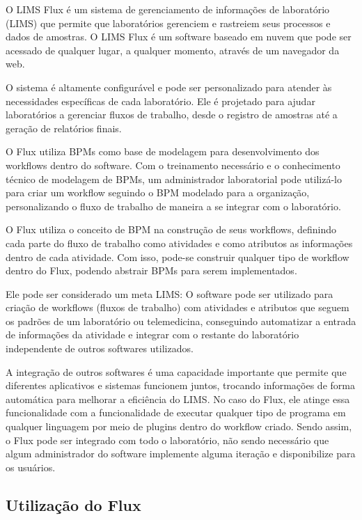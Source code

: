 
O LIMS Flux é um sistema de gerenciamento de informações de laboratório (LIMS) que permite que laboratórios gerenciem e rastreiem seus processos e dados de amostras. O LIMS Flux é um software baseado em nuvem que pode ser acessado de qualquer lugar, a qualquer momento, através de um navegador da web.

O sistema é altamente configurável e pode ser personalizado para atender às necessidades específicas de cada laboratório. Ele é projetado para ajudar laboratórios a gerenciar fluxos de trabalho, desde o registro de amostras até a geração de relatórios finais.

O Flux utiliza BPMs como base de modelagem para desenvolvimento dos workflows dentro do software. Com o treinamento necessário e o conhecimento técnico de modelagem de BPMs, um administrador laboratorial pode utilizá-lo para criar um workflow seguindo o BPM modelado para a organização, personalizando o fluxo de trabalho de maneira a se integrar com o laboratório.

O Flux utiliza o conceito de BPM na construção de seus workflows, definindo cada parte do fluxo de trabalho como atividades e como atributos as informações dentro de cada atividade. Com isso, pode-se construir qualquer tipo de workflow dentro do Flux, podendo abstrair BPMs para serem implementados.

Ele pode ser considerado um meta LIMS: O software pode ser utilizado para criação de workflows (fluxos de trabalho) com atividades e atributos que seguem os padrões de um laboratório ou telemedicina, conseguindo automatizar a entrada de informações da atividade e integrar com o restante do laboratório independente de outros softwares utilizados.

A integração de outros softwares é uma capacidade importante que permite que diferentes aplicativos e sistemas funcionem juntos, trocando informações de forma automática para melhorar a eficiência do LIMS. No caso do Flux, ele atinge essa funcionalidade com a funcionalidade de executar qualquer tipo de programa em qualquer linguagem por meio de plugins dentro do workflow criado.
Sendo assim, o Flux pode ser integrado com todo o laboratório, não sendo necessário que algum administrador do software implemente alguma iteração e disponibilize para os usuários.


\subsection{Utilização do Flux}

